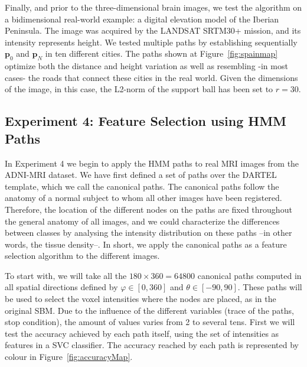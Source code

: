 Finally, and prior to the three-dimensional brain images, we test the algorithm on a bidimensional real-world example: a digital elevation model of the Iberian Peninsula. The image was acquired by the LANDSAT SRTM30+ mission, and its intensity represents height. We tested multiple paths by establishing sequentially $\mathbf{p}_0$ and $\mathbf{p}_N$ in ten different cities. The paths shown at Figure~\ref{fig:spainmap} optimize both the distance and height variation as well as resembling -in most cases- the roads that connect these cities in the real world. Given the dimensions of the image, in this case, the L2-norm of the support ball has been set to $r=30$. 


\subsection{Experiment 4: Feature Selection using HMM Paths}
In Experiment 4 we begin to apply the \ac{HMM} paths to real \ac{MRI} images from the ADNI-MRI dataset. We have first defined a set of paths over the DARTEL template, which we call the canonical paths. The canonical paths follow the anatomy of a normal subject to whom all other images have been registered. Therefore, the location of the different nodes on the paths are fixed throughout the general anatomy of all images, and we could characterize the differences between classes by analysing the intensity distribution on these paths --in other words, the tissue density--. In short, we apply the canonical paths as a feature selection algorithm to the different images. 

To start with, we will take all the $180\times360=64800$ canonical paths computed in all  spatial directions defined by $\varphi\in[0,360]$ and $\theta\in[-90,90]$. These paths will be used to select the voxel intensities where the nodes are placed, as in the original \ac{SBM}. Due to the influence of the different variables (trace of the paths, stop condition), the amount of values varies from 2 to several tens. First we will test the accuracy achieved by each path itself, using the set of intensities as features in a \ac{SVC} classifier. The accuracy reached by each path is represented by colour in Figure~\ref{fig:accuracyMap}. 

